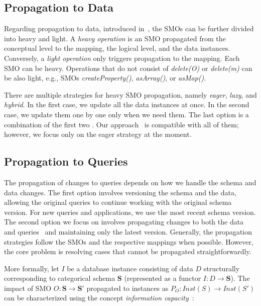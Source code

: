 \subsection{Propagation to Data}
Regarding propagation to data, introduced in~\citep{cikm_2022}, the SMOs can be further divided into heavy and light. A \textit{heavy operation} is an SMO propagated from the conceptual level to the mapping, the logical level, and the data instances. Conversely, a \textit{light operation} only triggers propagation to the mapping. Each SMO can be heavy. Operations that do not consist of \textit{delete(O)} or \textit{delete(m)} can be also light, e.g., SMOs \textit{createProperty()}, \textit{asArray()}, or \textit{asMap()}.

There are multiple strategies for heavy SMO propagation, namely \textit{eager}, \textit{lazy}, and \textit{hybrid}. In the first case, we update all the data instances at once. In the second case, we update them one by one only when we need them. The last option is a combination of the first two \citep{mm_cat_journal,storl2022darwin}. Our approach~\citep{cikm_2022} is compatible with all of them; however, we focus only on the eager strategy at the moment.

\subsection{Propagation to Queries}
The propagation of changes to queries depends on how we handle the schema and data changes. The first option involves versioning the schema and the data, allowing the original queries to continue working with the original schema version.  For new queries and applications, we use the most recent schema version. The second option we focus on involves propagating changes to both the data~\citep{cikm_2022} and queries~\citep{edbt_2024} and maintaining only the latest version. Generally, the propagation strategies follow the SMOs and the respective mappings when possible. However, the core problem is resolving cases that cannot be propagated straightforwardly.

More formally, let $I$ be a database instance consisting of data $D$ structurally corresponding to categorical schema $\mathbf{S}$
(represented as a functor $I : D \rightarrow \mathbf{S}$). The impact of SMO  $O: \mathbf{S} \rightarrow \mathbf{S'}$ propagated to instances as $P_O : Inst(S) \rightarrow Inst(S')$ can be characterized using the concept \textit{information capacity}~\citep{DBLP:journals/siamcomp/Hull86,10.1145/2903726}: 

